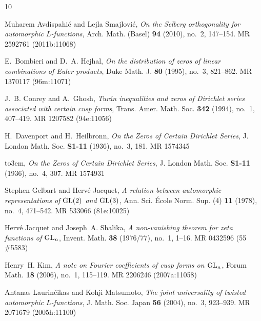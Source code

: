 \documentclass[11pt]{amsart}
\theoremstyle{remark}
\numberwithin{theorem}{section}
\numberwithin{equation}{section}
\begin{document}

\providecommand{\bysame}{\leavevmode\hbox to3em{\hrulefill}\thinspace}
\providecommand{\MR}{\relax\ifhmode\unskip\space\fi MR }
\providecommand{\MRhref}[2]{%
  \href{http://www.ams.org/mathscinet-getitem?mr=#1}{#2}
}
\providecommand{\href}[2]{#2}
\begin{thebibliography}{10}

Muharem Avdispahi{\'c} and Lejla Smajlovi{\'c}, \emph{On the {S}elberg
  orthogonality for automorphic {$L$}-functions}, Arch. Math. (Basel)
  \textbf{94} (2010), no.~2, 147--154. \MR{2592761 (2011b:11068)}

E.~Bombieri and D.~A. Hejhal, \emph{On the distribution of zeros of linear
  combinations of {E}uler products}, Duke Math. J. \textbf{80} (1995), no.~3,
  821--862. \MR{1370117 (96m:11071)}

J.~B. Conrey and A.~Ghosh, \emph{Tur\'an inequalities and zeros of {D}irichlet
  series associated with certain cusp forms}, Trans. Amer. Math. Soc.
  \textbf{342} (1994), no.~1, 407--419. \MR{1207582 (94e:11056)}

H.~Davenport and H.~Heilbronn, \emph{On the {Z}eros of {C}ertain {D}irichlet
  {S}eries}, J. London Math. Soc. \textbf{S1-11} (1936), no.~3, 181.
  \MR{1574345}

\bysame, \emph{On the {Z}eros of {C}ertain {D}irichlet {S}eries}, J. London
  Math. Soc. \textbf{S1-11} (1936), no.~4, 307. \MR{1574931}

Stephen Gelbart and Herv{\'e} Jacquet, \emph{A relation between automorphic
  representations of {${\rm GL}(2)$} and {${\rm GL}(3)$}}, Ann. Sci. \'Ecole
  Norm. Sup. (4) \textbf{11} (1978), no.~4, 471--542. \MR{533066 (81e:10025)}

Herv{\'e} Jacquet and Joseph~A. Shalika, \emph{A non-vanishing theorem for zeta
  functions of {${\rm GL}_{n}$}}, Invent. Math. \textbf{38} (1976/77), no.~1,
  1--16. \MR{0432596 (55 \#5583)}

Henry~H. Kim, \emph{A note on {F}ourier coefficients of cusp forms on {${\rm
  GL}_n$}}, Forum Math. \textbf{18} (2006), no.~1, 115--119. \MR{2206246
  (2007a:11058)}

Antanas Laurin{\v{c}}ikas and Kohji Matsumoto, \emph{The joint universality of
  twisted automorphic {$L$}-functions}, J. Math. Soc. Japan \textbf{56} (2004),
  no.~3, 923--939. \MR{2071679 (2005h:11100)}


\end{thebibliography}
\end{document}
